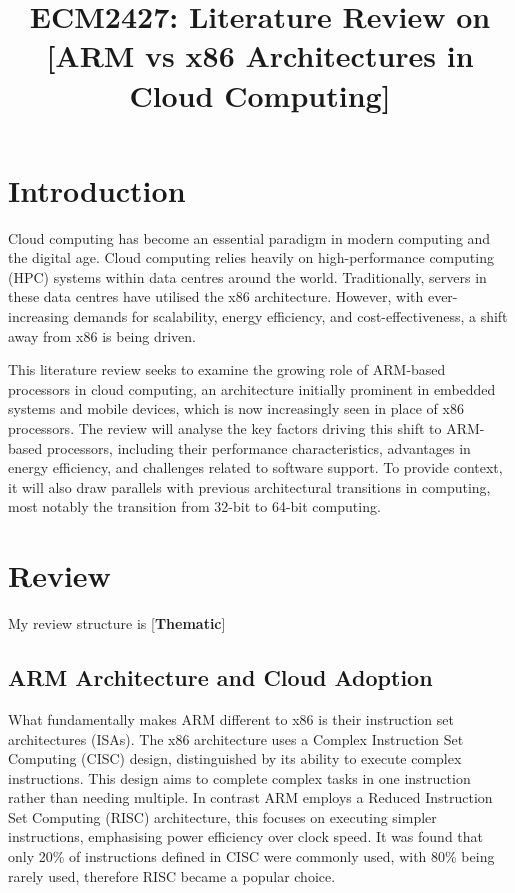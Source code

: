 \documentclass[conference]{IEEEtran}  %
\begin{document}
\title{ECM2427: Literature Review on [ARM vs x86 Architectures in Cloud Computing]}


\author{ %
}

\maketitle  %


\section{Introduction} %

Cloud computing has become an essential paradigm in modern computing and the digital age.
Cloud computing relies heavily on high-performance computing (HPC) systems within data centres around the world.
Traditionally, servers in these data centres have utilised the x86 architecture. However, with ever-increasing demands for scalability, energy efficiency, and cost-effectiveness, a shift away from x86 is being driven.

This literature review seeks to examine the growing role of ARM-based processors in cloud computing, an architecture initially prominent in embedded systems and mobile devices, which is now increasingly seen in place of x86 processors.
The review will analyse the key factors driving this shift to ARM-based processors, including their performance characteristics, advantages in energy efficiency, and challenges related to software support.
To provide context, it will also draw parallels with previous architectural transitions in computing, most notably the transition from 32-bit to 64-bit computing.

\section{Review} %

My review structure is [\textbf{Thematic}]
\subsection{ARM Architecture and Cloud Adoption}
What fundamentally makes ARM different to x86 is their instruction set architectures (ISAs).
The x86 architecture uses a Complex Instruction Set Computing (CISC) design, distinguished by its ability to execute complex instructions.
This design aims to complete complex tasks in one instruction rather than needing multiple. 
In contrast ARM employs a Reduced Instruction Set Computing (RISC) architecture, this focuses on executing simpler instructions, emphasising power efficiency over clock speed. \cite{ARM_RISC_vs_x86_SISC}
It was found that only 20\% of instructions defined in CISC were commonly used, with 80\% being rarely used, therefore RISC became a popular choice. \cite{instructions_CISC_vs_RISC}
\end{document}
